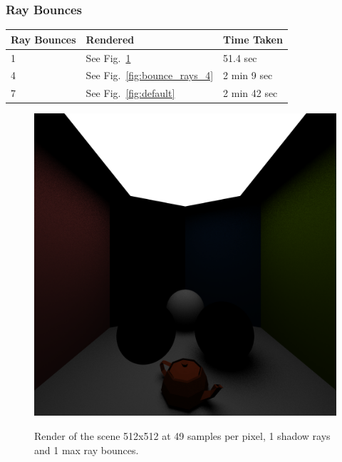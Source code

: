 \documentclass[a4paper, twocolumn]{article}
\begin{document}
            \subsubsection*{Ray Bounces}

            \begin{table}[H]
            \centering
            \begin{tabular}{lll}
                \toprule
                \textbf{Ray Bounces}&\textbf{Rendered}&\textbf{Time Taken}\\
                \midrule
                1&See Fig.~\ref{fig:bounce_rays_1}&51.4 sec\\
                4&See Fig.~\ref{fig:bounce_rays_4}&2 min 9 sec\\
                7&See Fig.~\ref{fig:default}&2 min 42 sec\\
                \bottomrule
            \end{tabular}
            \label{tab:ray_bounces}
            \end{table}

            \begin{figure}[H]
                \centering
                \caption{Render of the scene 512x512 at 49 samples per pixel, 1 shadow rays and 1 max ray bounces.}
                \includegraphics[width=0.8\linewidth]{share/results/bounce_rays_1.png}
                \label{fig:bounce_rays_1}
            \end{figure}
\end{document}
